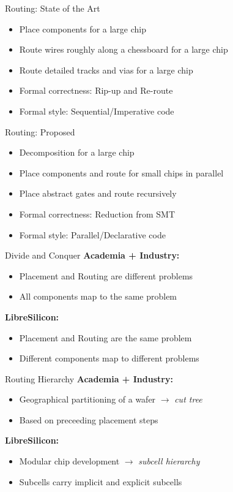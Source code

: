 \documentclass[aspectratio=169]{beamer}
\begin{document}
\begin{frame}{Routing: State of the Art}
	\begin{itemize}
        \setlength\itemsep{1em}
		\item Place components for a large chip
		\item Route wires roughly along a chessboard for a large chip
		\item Route detailed tracks and vias for a large chip
		\item Formal correctness: Rip-up and Re-route
		\item Formal style: Sequential/Imperative code
	\end{itemize}
\end{frame}

\begin{frame}{Routing: Proposed}
	\begin{itemize}
        \setlength\itemsep{1em}
		\item Decomposition for a large chip
		\item Place components and route for small chips in parallel
		\item Place abstract gates and route recursively
		\item Formal correctness: Reduction from SMT
		\item Formal style: Parallel/Declarative code
	\end{itemize}
\end{frame}

\begin{frame}{Divide and Conquer}
	    \textbf{Academia + Industry:}
	    \begin{itemize}
		\item Placement and Routing are different problems
		\item All components map to the same problem
	    \end{itemize}
	    \textbf{LibreSilicon:}
	    \begin{itemize}
		\item Placement and Routing are the same problem
		\item Different components map to different problems
	    \end{itemize}
\end{frame}

\begin{frame}{Routing Hierarchy}
	    \textbf{Academia + Industry:}
	    \begin{itemize}
		\item Geographical partitioning of a wafer $\rightarrow$ \textit{cut tree}
		\item Based on preceeding placement steps
	    \end{itemize}
	    \textbf{LibreSilicon:}
	    \begin{itemize}
		\item Modular chip development $\rightarrow$ \textit{subcell hierarchy}
		\item Subcells carry implicit and explicit subcells
	    \end{itemize}
\end{frame}
\end{document}
